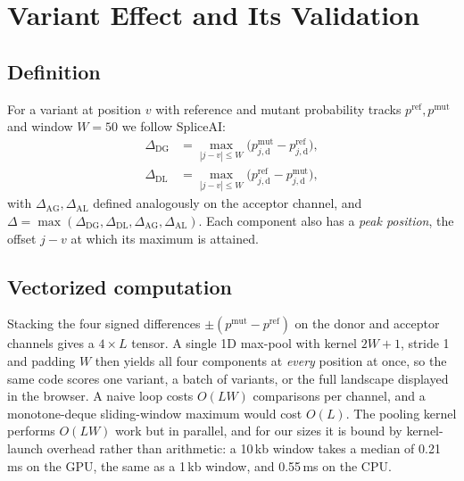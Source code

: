 \documentclass[conference]{IEEEtran}
\begin{document}
\section{Variant Effect and Its Validation}\label{sec:delta}
\subsection{Definition}
For a variant at position $v$ with reference and mutant probability tracks $p^{\mathrm{ref}},p^{\mathrm{mut}}$ and window $W=50$ we follow SpliceAI:
\begin{align}
\Delta_{\mathrm{DG}} &= \max_{|j-v|\le W} \big(p^{\mathrm{mut}}_{j,\mathrm{d}} - p^{\mathrm{ref}}_{j,\mathrm{d}}\big),\\
\Delta_{\mathrm{DL}} &= \max_{|j-v|\le W} \big(p^{\mathrm{ref}}_{j,\mathrm{d}} - p^{\mathrm{mut}}_{j,\mathrm{d}}\big),
\end{align}
with $\Delta_{\mathrm{AG}},\Delta_{\mathrm{AL}}$ defined analogously on the acceptor channel, and $\Delta=\max(\Delta_{\mathrm{DG}},\Delta_{\mathrm{DL}},\Delta_{\mathrm{AG}},\Delta_{\mathrm{AL}})$. Each component also has a \emph{peak position}, the offset $j-v$ at which its maximum is attained.

\subsection{Vectorized computation}
Stacking the four signed differences $\pm(p^{\mathrm{mut}}-p^{\mathrm{ref}})$ on the donor and acceptor channels gives a $4\times L$ tensor. A single 1D max-pool with kernel $2W+1$, stride 1 and padding $W$ then yields all four components at \emph{every} position at once, so the same code scores one variant, a batch of variants, or the full landscape displayed in the browser. A naive loop costs $O(LW)$ comparisons per channel, and a monotone-deque sliding-window maximum would cost $O(L)$. The pooling kernel performs $O(LW)$ work but in parallel, and for our sizes it is bound by kernel-launch overhead rather than arithmetic: a 10\,kb window takes a median of 0.21\,ms on the GPU, the same as a 1\,kb window, and 0.55\,ms on the CPU.
\end{document}
